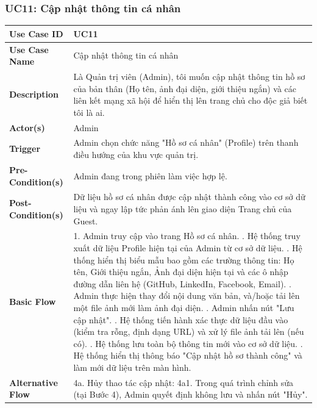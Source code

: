 \documentclass[a4paper,12pt]{article}
\begin{document}
\subsubsection{UC11: Cập nhật thông tin cá nhân}
\begin{longtable}{|p{4cm}|p{11.5cm}|}
\hline
\textbf{Use Case ID} & UC11 \\ \hline
\textbf{Use Case Name} & Cập nhật thông tin cá nhân \\ \hline
\textbf{Description} & Là Quản trị viên (Admin), tôi muốn cập nhật thông tin hồ sơ của bản thân (Họ tên, ảnh đại diện, giới thiệu ngắn) và các liên kết mạng xã hội để hiển thị lên trang chủ cho độc giả biết tôi là ai. \\ \hline
\textbf{Actor(s)} & Admin \\ \hline
\textbf{Trigger} & Admin chọn chức năng "Hồ sơ cá nhân" (Profile) trên thanh điều hướng của khu vực quản trị. \\ \hline
\textbf{Pre-Condition(s)} & Admin đang trong phiên làm việc hợp lệ. \\ \hline
\textbf{Post-Condition(s)} & Dữ liệu hồ sơ cá nhân được cập nhật thành công vào cơ sở dữ liệu và ngay lập tức phản ánh lên giao diện Trang chủ của Guest. \\ \hline
\textbf{Basic Flow} & 
1. Admin truy cập vào trang Hồ sơ cá nhân. \newline
2. Hệ thống truy xuất dữ liệu Profile hiện tại của Admin từ cơ sở dữ liệu. \newline
3. Hệ thống hiển thị biểu mẫu bao gồm các trường thông tin: Họ tên, Giới thiệu ngắn, Ảnh đại diện hiện tại và các ô nhập đường dẫn liên hệ (GitHub, LinkedIn, Facebook, Email). \newline
4. Admin thực hiện thay đổi nội dung văn bản, và/hoặc tải lên một file ảnh mới làm ảnh đại diện. \newline
5. Admin nhấn nút "Lưu cập nhật". \newline
6. Hệ thống tiến hành xác thực dữ liệu đầu vào (kiểm tra rỗng, định dạng URL) và xử lý file ảnh tải lên (nếu có). \newline
7. Hệ thống lưu toàn bộ thông tin mới vào cơ sở dữ liệu. \newline
8. Hệ thống hiển thị thông báo "Cập nhật hồ sơ thành công" và làm mới dữ liệu trên màn hình. \\ \hline
\textbf{Alternative Flow} & 
4a. Hủy thao tác cập nhật: \newline
4a1. Trong quá trình chỉnh sửa (tại Bước 4), Admin quyết định không lưu và nhấn nút "Hủy". \newline

\end{longtable}
\end{document}
